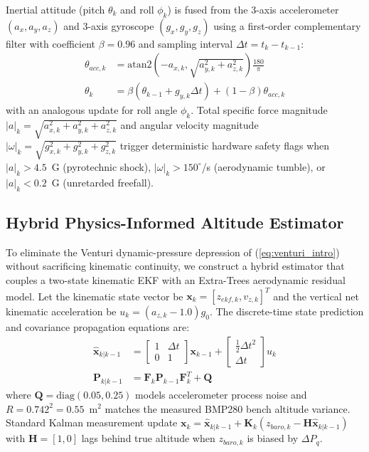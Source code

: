 \documentclass[conference]{IEEEtran}
\begin{document}
Inertial attitude (pitch $\theta_k$ and roll $\phi_k$) is fused from the 3-axis accelerometer $(a_x, a_y, a_z)$ and 3-axis gyroscope $(g_x, g_y, g_z)$ using a first-order complementary filter with coefficient $\beta = 0.96$ and sampling interval $\Delta t = t_k - t_{k-1}$:
\begin{align}
\theta_{acc,k} &= \text{atan2}\left(-a_{x,k}, \sqrt{a_{y,k}^2 + a_{z,k}^2}\right) \frac{180}{\pi} \label{eq:pitch_acc} \\
\theta_k &= \beta \left(\theta_{k-1} + g_{y,k} \Delta t\right) + (1 - \beta) \theta_{acc,k} \label{eq:complementary}
\end{align}
with an analogous update for roll angle $\phi_k$. Total specific force magnitude $|a|_k = \sqrt{a_{x,k}^2 + a_{y,k}^2 + a_{z,k}^2}$ and angular velocity magnitude $|\omega|_k = \sqrt{g_{x,k}^2 + g_{y,k}^2 + g_{z,k}^2}$ trigger deterministic hardware safety flags when $|a|_k > 4.5$~G (pyrotechnic shock), $|\omega|_k > 150^\circ$/s (aerodynamic tumble), or $|a|_k < 0.2$~G (unretarded freefall).

\subsection{Hybrid Physics-Informed Altitude Estimator}
To eliminate the Venturi dynamic-pressure depression of (\ref{eq:venturi_intro}) without sacrificing kinematic continuity, we construct a hybrid estimator that couples a two-state kinematic EKF with an Extra-Trees aerodynamic residual model. Let the kinematic state vector be $\mathbf{x}_k = [z_{ekf,k}, v_{z,k}]^T$ and the vertical net kinematic acceleration be $u_k = (a_{z,k} - 1.0) g_0$. The discrete-time state prediction and covariance propagation equations are:
\begin{align}
\hat{\mathbf{x}}_{k|k-1} &= \begin{bmatrix} 1 & \Delta t \\ 0 & 1 \end{bmatrix} \mathbf{x}_{k-1} + \begin{bmatrix} \frac{1}{2}\Delta t^2 \\ \Delta t \end{bmatrix} u_k \label{eq:ekf_pred} \\
\mathbf{P}_{k|k-1} &= \mathbf{F}_k \mathbf{P}_{k-1} \mathbf{F}_k^T + \mathbf{Q} \label{eq:ekf_cov}
\end{align}
where $\mathbf{Q} = \text{diag}(0.05, 0.25)$ models accelerometer process noise and $R = 0.742^2 = 0.55$~m$^2$ matches the measured BMP280 bench altitude variance. Standard Kalman measurement update $\mathbf{x}_k = \hat{\mathbf{x}}_{k|k-1} + \mathbf{K}_k (z_{baro,k} - \mathbf{H}\hat{\mathbf{x}}_{k|k-1})$ with $\mathbf{H} = [1, 0]$ lags behind true altitude when $z_{baro,k}$ is biased by $\Delta P_q$.
\end{document}
